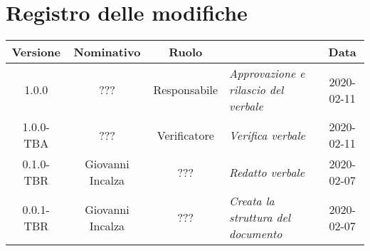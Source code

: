 \section*{Registro delle modifiche}
\renewcommand{\arraystretch}{1.8}

  \begin{longtable}{|c|c|c|p{3.8cm}|c|}
    \hline

    \rowcolor{header}
    \textbf{Versione} & \textbf{Nominativo} & \textbf{Ruolo} & \centering{\textbf{Descrizione}} & \textbf{Data}\\

    \hline
    1.0.0 & ??? & Responsabile & \small{\textit{Approvazione e rilascio del verbale}} & 2020-02-11\\
    1.0.0-TBA & ??? & Verificatore & \small{\textit{Verifica verbale}} & 2020-02-11\\
	0.1.0-TBR & Giovanni Incalza & ??? & \small{\textit{Redatto verbale}} & 2020-02-07\\
    0.0.1-TBR & Giovanni Incalza & ??? & \small{\textit{Creata la struttura del documento}} & 2020-02-07\\

    \hline
  \end{longtable}
